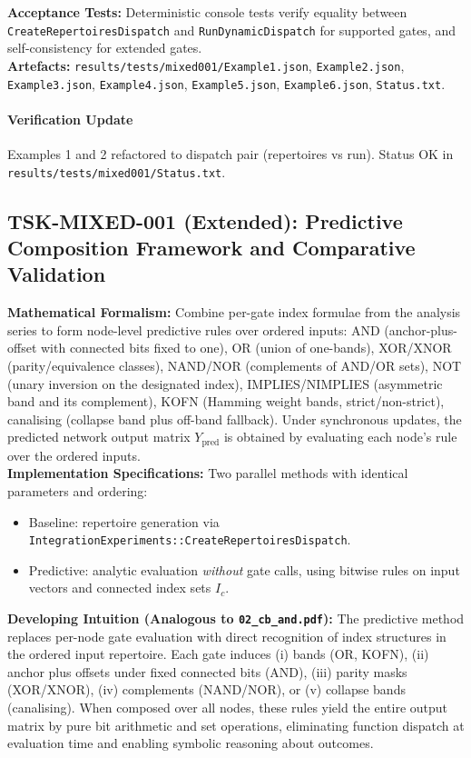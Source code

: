 \documentclass[11pt]{article}
\begin{document}
\textbf{Acceptance Tests:} Deterministic console tests verify equality between \texttt{CreateRepertoiresDispatch} and \texttt{RunDynamicDispatch} for supported gates, and self-consistency for extended gates.\\
\textbf{Artefacts:} \texttt{results/tests/mixed001/Example1.json}, \texttt{Example2.json}, \texttt{Example3.json}, \texttt{Example4.json}, \texttt{Example5.json}, \texttt{Example6.json}, \texttt{Status.txt}.\\
\paragraph{Verification Update} Examples 1 and 2 refactored to dispatch pair (repertoires vs run). Status OK in \texttt{results/tests/mixed001/Status.txt}.
\subsection{TSK-MIXED-001 (Extended): Predictive Composition Framework and Comparative Validation}
\textbf{Mathematical Formalism:} Combine per-gate index formulae from the analysis series to form node-level predictive rules over ordered inputs: AND (anchor-plus-offset with connected bits fixed to one), OR (union of one-bands), XOR/XNOR (parity/equivalence classes), NAND/NOR (complements of AND/OR sets), NOT (unary inversion on the designated index), IMPLIES/NIMPLIES (asymmetric band and its complement), KOFN (Hamming weight bands, strict/non-strict), canalising (collapse band plus off-band fallback). Under synchronous updates, the predicted network output matrix \(Y_{\mathrm{pred}}\) is obtained by evaluating each node’s rule over the ordered inputs.\\
\textbf{Implementation Specifications:} Two parallel methods with identical parameters and ordering:
\begin{itemize}
 \item Baseline: repertoire generation via \texttt{Integration\textasciigrave Experiments::CreateRepertoiresDispatch}.
 \item Predictive: analytic evaluation \textit{without} gate calls, using bitwise rules on input vectors and connected index sets \(I_c\).
\end{itemize}
\textbf{Developing Intuition (Analogous to \texttt{02\_cb\_and.pdf}):} The predictive method replaces per-node gate evaluation with direct recognition of index structures in the ordered input repertoire. Each gate induces (i) bands (OR, KOFN), (ii) anchor plus offsets under fixed connected bits (AND), (iii) parity masks (XOR/XNOR), (iv) complements (NAND/NOR), or (v) collapse bands (canalising). When composed over all nodes, these rules yield the entire output matrix by pure bit arithmetic and set operations, eliminating function dispatch at evaluation time and enabling symbolic reasoning about outcomes.\\
\end{document}
